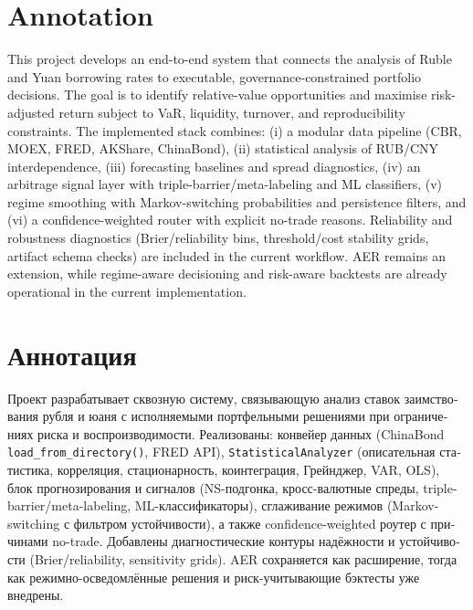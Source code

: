 \documentclass[a4paper,12pt]{extarticle}
\begin{document}
%
\newpage
\setcounter{page}{2}

{
	\hypersetup{linkcolor=black}
	\tableofcontents
}

\newpage

\newpage
\section*{Annotation} 

This project develops an end-to-end system that connects the analysis of Ruble and Yuan borrowing rates to executable, governance-constrained portfolio decisions. The goal is to identify relative-value opportunities and maximise risk-adjusted return subject to VaR, liquidity, turnover, and reproducibility constraints. The implemented stack combines: (i) a modular data pipeline (CBR, MOEX, FRED, AKShare, ChinaBond), (ii) statistical analysis of RUB/CNY interdependence, (iii) forecasting baselines and spread diagnostics, (iv) an arbitrage signal layer with triple-barrier/meta-labeling and ML classifiers, (v) regime smoothing with Markov-switching probabilities and persistence filters, and (vi) a confidence-weighted router with explicit no-trade reasons. Reliability and robustness diagnostics (Brier/reliability bins, threshold/cost stability grids, artifact schema checks) are included in the current workflow. AER remains an extension, while regime-aware decisioning and risk-aware backtests are already operational in the current implementation.

\section*{\foreignlanguage{russian}{Аннотация}}
\foreignlanguage{russian}{
Проект разрабатывает сквозную систему, связывающую анализ ставок заимствования рубля и юаня с исполняемыми портфельными решениями при ограничениях риска и воспроизводимости. Реализованы: конвейер данных (ChinaBond \texttt{load\_from\_directory()}, FRED API), \texttt{StatisticalAnalyzer} (описательная статистика, корреляция, стационарность, коинтеграция, Грейнджер, VAR, OLS), блок прогнозирования и сигналов (NS-подгонка, кросс-валютные спреды, triple-barrier/meta-labeling, ML-классификаторы), сглаживание режимов (Markov-switching с фильтром устойчивости), а также confidence-weighted роутер с причинами no-trade. Добавлены диагностические контуры надёжности и устойчивости (Brier/reliability, sensitivity grids). AER сохраняется как расширение, тогда как режимно-осведомлённые решения и риск-учитывающие бэктесты уже внедрены.
}
\end{document}
